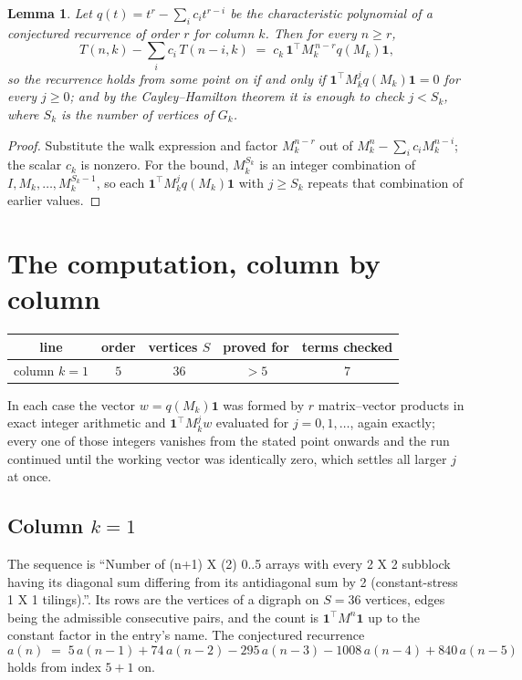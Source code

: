 \documentclass[11pt,a4paper]{article}
\theoremstyle{plain}
\newtheorem{lemma}[theorem]{Lemma}
\theoremstyle{definition}
\begin{document}
\begin{lemma}\label{lem:crit}
Let $q(t)=t^{r}-\sum_i c_it^{r-i}$ be the characteristic polynomial of a conjectured
recurrence of order $r$ for column $k$. Then for every $n\ge r$,
\[
T(n,k)-\sum_i c_i\,T(n-i,k)\;=\;c_k\,\mathbf{1}^{\!\top}M_k^{\,n-r}q(M_k)\mathbf{1},
\]
so the recurrence holds from some point on if and only if
$\mathbf{1}^{\!\top}M_k^{j}q(M_k)\mathbf{1}=0$ for every $j\ge0$; and by the
Cayley--Hamilton theorem it is enough to check $j<S_k$, where $S_k$ is the number of vertices
of $G_k$.
\end{lemma}

\begin{proof}
Substitute the walk expression and factor $M_k^{n-r}$ out of $M_k^{n}-\sum_ic_iM_k^{n-i}$;
the scalar $c_k$ is nonzero. For the bound, $M_k^{S_k}$ is an integer combination of
$I,M_k,\dots,M_k^{S_k-1}$, so each $\mathbf{1}^{\!\top}M_k^{j}q(M_k)\mathbf{1}$ with
$j\ge S_k$ repeats that combination of earlier values.
\end{proof}

\section{The computation, column by column}

\begin{center}
\begin{tabular}{ccccc}
line & order & vertices $S$ & proved for & terms checked \\ \hline
column $k$$=1$ & $5$ & $36$ & $>5$ & $7$ \\
\end{tabular}
\end{center}

In each case the vector $w=q(M_k)\mathbf{1}$ was formed by $r$ matrix--vector products in
exact integer arithmetic and $\mathbf{1}^{\!\top}M_k^{j}w$ evaluated for $j=0,1,\dots$,
again exactly; every one of those integers vanishes from the stated point onwards and the run
continued until the working vector was identically zero, which settles all larger $j$ at once.

\subsection*{Column $k$$=1$}
The sequence is ``Number of (n+1) X (2) 0..5 arrays with every 2 X 2 subblock having its diagonal sum differing from its antidiagonal sum by 2 (constant-stress 1 X 1 tilings).''. Its rows are the vertices of a digraph on
$S=36$ vertices, edges being the admissible consecutive pairs, and the count is
$\mathbf{1}^{\!\top}M^{n}\mathbf{1}$ up to the constant factor in the entry's name.
The conjectured recurrence
\[
a(n)\;=\;5\,a(n-1) + 74\,a(n-2) - 295\,a(n-3) - 1008\,a(n-4) + 840\,a(n-5)
\]
holds from index $5+1$ on.
\end{document}
